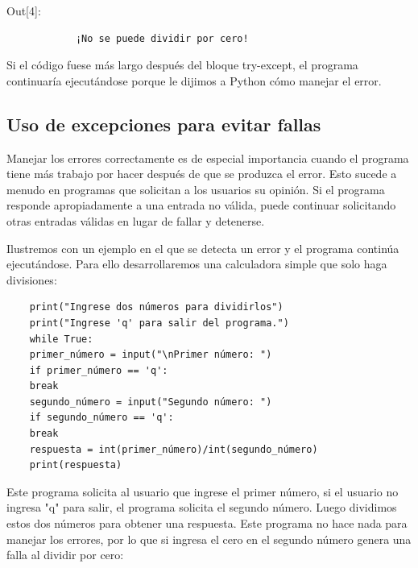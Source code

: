 {\ttfamily\scriptsize\scriptsize 
	\hspace{-0.65cm}Out[4]:\vspace{-0.3cm}	
	{\color{blue} 	
		\begin{verbatim}
			¡No se puede dividir por cero!
		\end{verbatim}
}}
Si el código fuese  más largo después del bloque {\ttfamily try-except}, el programa continuaría
ejecutándose porque le dijimos a Python cómo manejar el error. 


\subsection{Uso de excepciones para evitar fallas}

Manejar los errores correctamente es de especial importancia cuando el programa tiene
más trabajo por hacer después de que se produzca el error. Esto sucede a menudo en programas
que solicitan a los usuarios su opinión. Si el programa responde apropiadamente a una entrada no válida,
puede continuar solicitando otras entradas válidas en lugar de fallar y detenerse.

Ilustremos con un ejemplo en el que se detecta un error y el programa continúa ejecutándose.
Para ello desarrollaremos  una calculadora simple que solo haga divisiones:


\hspace{-2.2cm}{\ttfamily \scriptsize calcula}

\vspace{-0.2cm}
\hspace{-2.0cm}{\ttfamily \scriptsize dora.py}\vspace{-0.84cm}
\begin{lstlisting}
	print("Ingrese dos números para dividirlos")
	print("Ingrese 'q' para salir del programa.")
	while True:
	primer_número = input("\nPrimer número: ")
	if primer_número == 'q':
	break
	segundo_número = input("Segundo número: ")
	if segundo_número == 'q':
	break
	respuesta = int(primer_número)/int(segundo_número)
	print(respuesta)
\end{lstlisting} 

Este programa solicita al usuario que ingrese el primer número, si el usuario no ingresa {\ttfamily {}"{}q{}"{}} para salir, el programa solicita el segundo número.  Luego dividimos estos dos números para obtener una respuesta. 
Este programa no hace nada para manejar los errores, por lo que si ingresa el cero en el segundo número 
genera una falla al dividir por cero:

